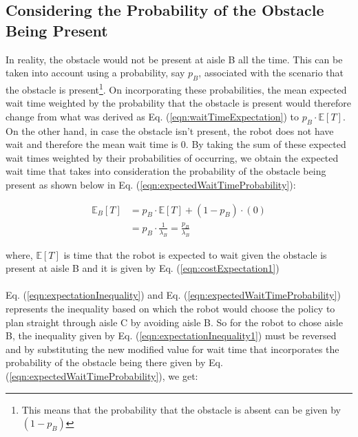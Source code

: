 \documentclass[a4paper,12pt]{article}
\begin{document}
		\subsection{Considering the Probability of the Obstacle Being Present}
		\label{sec:consideringProbaboilityOfObstacle}
		
			In reality, the obstacle would not be present at aisle B all the time. This can be taken into account using a probability, say $p_B$, associated with the scenario that the obstacle is present\footnote{This means that the probability that the obstacle is absent can be given by $ (1-p_B) $}. On incorporating these probabilities, the mean expected wait time weighted by the probability that the obstacle is present would therefore change from what was derived as Eq. (\ref{eqn:waitTimeExpectation}) to $p_B \cdot \mathbb{E}[T]$. On the other hand, in case the obstacle isn't present, the robot does not have wait and therefore the mean wait time is 0. By taking the sum of these expected wait times weighted by their probabilities of occurring, we obtain the expected wait time that takes into consideration the probability of the obstacle being present as shown below in Eq. (\ref{eqn:expectedWaitTimeProbability}):
			
			\begin{equation}
			\begin{split}
			\mathbb{E}_B[T] &= p_B \cdot \mathbb{E}[T] + \left(1 - p_{B}\right) \cdot \left(0\right) \\
			&= p_B \cdot \frac{1}{\lambda_B} = \frac{p_B}{\lambda_B}
			\end{split}
			\label{eqn:expectedWaitTimeProbability}
			\end{equation}
			
			where, $\mathbb{E}[T]$ is time that the robot is expected to wait given the obstacle is present at aisle B and it is given by Eq. (\ref{eqn:costExpectation1})
			\\ 
			\\
			Eq. (\ref{eqn:expectationInequality}) and Eq. (\ref{eqn:expectedWaitTimeProbability}) represents the inequality based on which the robot would choose the policy to plan straight through aisle C by avoiding aisle B. So for the robot to chose aisle B, the inequality given by Eq. (\ref{eqn:expectationInequality1}) must be reversed and by substituting the new modified value for wait time that incorporates the probability of the obstacle being there given by Eq. (\ref{eqn:expectedWaitTimeProbability}), we get: 
			
\end{document}
